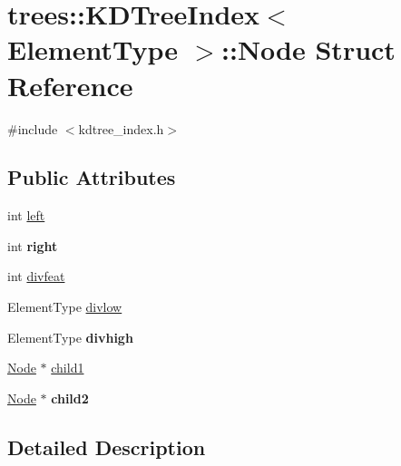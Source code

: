 \hypertarget{structtrees_1_1_k_d_tree_index_1_1_node}{}\section{trees\+:\+:K\+D\+Tree\+Index$<$ Element\+Type $>$\+:\+:Node Struct Reference}
\label{structtrees_1_1_k_d_tree_index_1_1_node}


{\ttfamily \#include $<$kdtree\+\_\+index.\+h$>$}

\subsection*{Public Attributes}
\begin{DoxyCompactItemize}
\item 
int \hyperlink{structtrees_1_1_k_d_tree_index_1_1_node_aae063499d92e644cfc075f9c151b185b}{left}
\item 
\mbox{\label{structtrees_1_1_k_d_tree_index_1_1_node_a601b2967dc00c2c31217edf6d00a4edc}} 
int {\bfseries right}
\item 
int \hyperlink{structtrees_1_1_k_d_tree_index_1_1_node_a74e21eb4490a4c6096de83affb7a4867}{divfeat}
\item 
Element\+Type \hyperlink{structtrees_1_1_k_d_tree_index_1_1_node_aa80b732e6a6da3c9d43b09efdf949a06}{divlow}
\item 
\mbox{\label{structtrees_1_1_k_d_tree_index_1_1_node_a8b613dd555800178d8cc871a3bf39b85}} 
Element\+Type {\bfseries divhigh}
\item 
\hyperlink{structtrees_1_1_k_d_tree_index_1_1_node}{Node} $\ast$ \hyperlink{structtrees_1_1_k_d_tree_index_1_1_node_aa210b66e05f8a061872e46893dbb614e}{child1}
\item 
\mbox{\label{structtrees_1_1_k_d_tree_index_1_1_node_ade8a4b109317e4059ee99f89aad390dd}} 
\hyperlink{structtrees_1_1_k_d_tree_index_1_1_node}{Node} $\ast$ {\bfseries child2}
\end{DoxyCompactItemize}


\subsection{Detailed Description}
